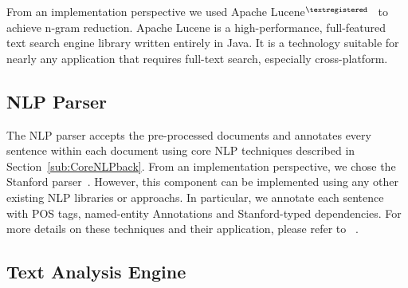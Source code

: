 From an implementation perspective we used Apache Lucene$^{\textregistered}$~\cite{lucene} to achieve n-gram reduction.
Apache Lucene is a high-performance, full-featured text search engine library written entirely in Java.
It is a technology suitable for nearly any application that requires full-text search, especially cross-platform.

	
\subsection{NLP Parser}


The NLP parser accepts the pre-processed documents and annotates every sentence within each document using core NLP techniques described in Section~\ref{sub:CoreNLPback}.
From an implementation perspective, we chose the Stanford parser~\cite{SNLP}.
However, this component can be implemented using any other existing NLP libraries or approachs.
In particular, we annotate each sentence with POS tags, named-entity Annotations and Stanford-typed dependencies.
For more details on these techniques and their application, please refer to ~\cite{Marneffe06LREC, Marneffe08COLING, pandita12:inferring, pandita13:WHYPER, thummalapentaICSE12}.

%

\subsection{Text Analysis Engine}
\label{sub:TAE}
%

